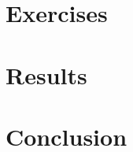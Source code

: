 \documentclass{article}
\begin{document}
\section{Exercises}


\section{Results}
\begin{table}
    
\end{table}

\section{Conclusion}
\end{document}
